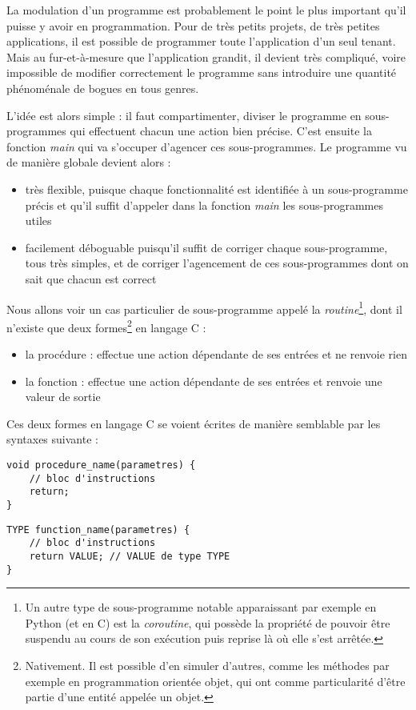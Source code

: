 \documentclass[../../../main.tex]{subfiles}
\begin{document}
La modulation d'un programme est probablement le point le plus important qu'il puisse y avoir en programmation. Pour de très petits projets, de très petites applications, il est possible de programmer toute l'application d'un seul tenant. Mais au fur-et-à-mesure que l'application grandit, il devient très compliqué, voire impossible de modifier correctement le programme sans introduire une quantité phénoménale de bogues en tous genres.
 
L'idée est alors simple : il faut compartimenter, diviser le programme en sous-programmes qui effectuent chacun une action bien précise. C'est ensuite la fonction \textit{main} qui va s'occuper d'agencer ces sous-programmes. Le programme vu de manière globale devient alors :
\begin{itemize}
	\item très flexible, puisque chaque fonctionnalité est identifiée à un sous-programme précis et qu'il suffit d'appeler dans la fonction \textit{main} les sous-programmes utiles
	\item facilement déboguable puisqu'il suffit de corriger chaque sous-programme, tous très simples, et de corriger l'agencement de ces sous-programmes dont on sait que chacun est correct
\end{itemize}
Nous allons voir un cas particulier de sous-programme appelé la \textit{routine}\footnote{Un autre type de sous-programme notable apparaissant par exemple en Python 	(et en C) est la \textit{coroutine}, qui possède la propriété de pouvoir être suspendu au cours de son exécution puis reprise là où elle s'est arrêtée.}, dont il n'existe que deux formes\footnote{Nativement. Il est possible d'en simuler d'autres, comme les méthodes par exemple en programmation orientée objet, qui ont comme particularité d'être partie d'une entité appelée un objet.} en langage C :
\begin{itemize}
	\item la procédure : effectue une action dépendante de ses entrées et ne renvoie rien
	\item la fonction : effectue une action dépendante de ses entrées et renvoie une valeur de sortie
\end{itemize}
Ces deux formes en langage C se voient écrites de manière semblable par les syntaxes suivante :

\begin{minipage}{0.5\textwidth}
\begin{verbatim}
void procedure_name(parametres) {
	// bloc d'instructions
	return;
}
\end{verbatim}
\end{minipage}
\begin{minipage}{0.5\textwidth}
\begin{verbatim}
TYPE function_name(parametres) {
	// bloc d'instructions
	return VALUE; // VALUE de type TYPE
}
\end{verbatim}
\end{minipage}
 
\end{document}
